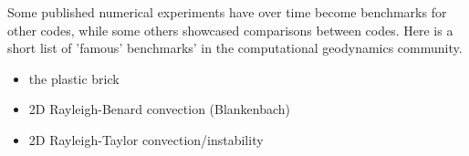 Some published numerical experiments have over time become benchmarks for other codes, while some 
others showcased comparisons between codes. Here is a short list of 'famous' benchmarks' in the 
computational geodynamics community.

\begin{itemize}
\item the plastic brick \cite{lemm08,kaus10,qurj09,mishin11,maie12,spmw16,gltf18,frbt19}
\item 2D Rayleigh-Benard convection (Blankenbach)  \cite{blbc89,trha98,chhl08,king09,lezh11,vyrc13,trab90,bepo10}
\item 2D Rayleigh-Taylor convection/instability \cite{pros81,trab90,wesc92,popo92,soga01,bast02,taki03,bomh06, basd08,qurj09,saev10,como97,lezh11,lomw12,vyrc13,vaks97,bomh06,chtl13,deka08,mishin11,maie12,fusc13,devv00a,dadh07,demh19}



\end{itemize}
